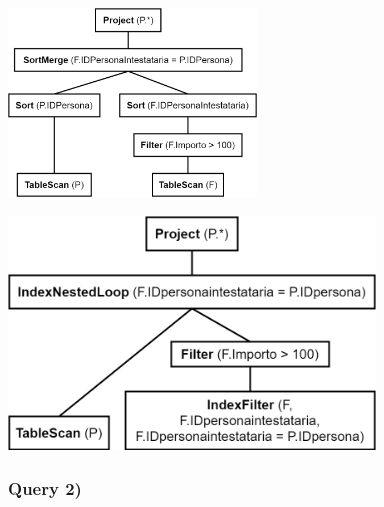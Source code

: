 \documentclass[a4paper,12pt]{article}
\begin{document}
\begin{minipage}{\textwidth}
\begin{multicols}{2}

\null \vfill
\includegraphics[height=5cm]{ Albero fisico 1.png }
\vfill \null

\columnbreak

\includegraphics[height=6.2cm]{ Albero fisico 1 indici.png }
\end{multicols}
\end{minipage}

 \subsubsection{ Query 2) }
\end{document}
